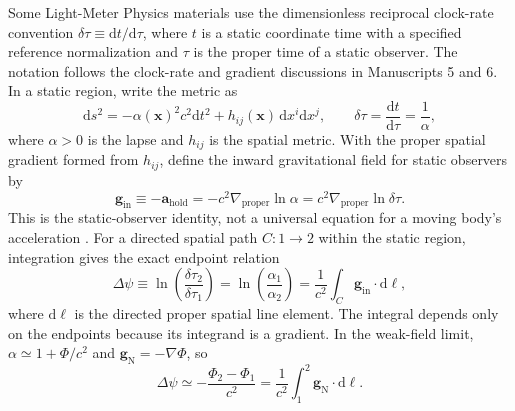 \documentclass[12pt]{article}
\begin{document}
Some Light-Meter Physics materials use the dimensionless reciprocal clock-rate convention $\delta\tau\equiv\mathrm{d}t/\mathrm{d}\tau$, where $t$ is a static coordinate time with a specified reference normalization and $\tau$ is the proper time of a static observer. The notation follows the clock-rate and gradient discussions in Manuscripts 5 and 6. In a static region, write the metric as
\begin{equation}
  \mathrm{d}s^2=-\alpha(\mathbf{x})^2c^2\mathrm{d}t^2
  +h_{ij}(\mathbf{x})\,\mathrm{d}x^i\mathrm{d}x^j,
  \qquad
  \delta\tau=\frac{\mathrm{d}t}{\mathrm{d}\tau}=\frac{1}{\alpha},
  \label{eq:static-metric-clock-rate}
\end{equation}
where $\alpha>0$ is the lapse and $h_{ij}$ is the spatial metric. With the proper spatial gradient formed from $h_{ij}$, define the inward gravitational field for static observers by
\begin{equation}
  \mathbf{g}_{\mathrm{in}}
  \equiv-\mathbf{a}_{\mathrm{hold}}
  =-c^2\nabla_{\mathrm{proper}}\ln\alpha
  =c^2\nabla_{\mathrm{proper}}\ln\delta\tau.
  \label{eq:static-inward-field}
\end{equation}
This is the static-observer identity, not a universal equation for a moving body's acceleration \cite{SantiagoVisser}. For a directed spatial path $C:1\to2$ within the static region, integration gives the exact endpoint relation
\begin{equation}
  \Delta\psi\equiv\ln\!\left(\frac{\delta\tau_2}{\delta\tau_1}\right)
  =\ln\!\left(\frac{\alpha_1}{\alpha_2}\right)
  =\frac{1}{c^2}\int_C\mathbf{g}_{\mathrm{in}}
  \cdot\mathrm{d}\boldsymbol{\ell},
  \label{eq:static-clock-gradient-integral}
\end{equation}
where $\mathrm{d}\boldsymbol{\ell}$ is the directed proper spatial line element. The integral depends only on the endpoints because its integrand is a gradient. In the weak-field limit, $\alpha\simeq1+\Phi/c^2$ and $\mathbf{g}_{\mathrm{N}}=-\nabla\Phi$, so
\begin{equation}
  \Delta\psi\simeq-\frac{\Phi_2-\Phi_1}{c^2}
  =\frac{1}{c^2}\int_1^2\mathbf{g}_{\mathrm{N}}
  \cdot\mathrm{d}\boldsymbol{\ell}.
  \label{eq:weak-field-clock-integral}
\end{equation}
\end{document}
